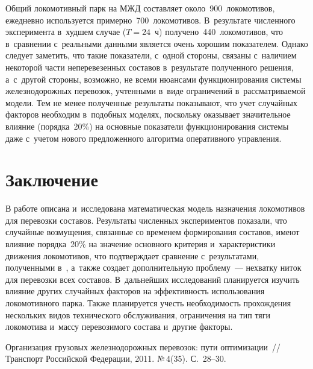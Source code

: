 \begin{multicols}{2}
Общий локомотивный парк на МЖД составляет около~900~локомотивов, 
ежедневно используется примерно~700~локомотивов.
В~результате численного эксперимента в~худшем случае ($T = 24$~ч) 
получено~440~локомотивов,
что в~сравнении с~реальными данными является очень хорошим показателем. Однако 
следует заметить,
что такие показатели, с~одной стороны, связаны с~наличием некоторой части 
неперевезенных составов в~результате полученного решения,
а~с~другой стороны, возможно, не всеми нюансами функционирования системы
 железнодорожных перевозок,
учтенными в~виде ограничений в~рассматриваемой модели. Тем не менее 
полученные результаты показывают, что учет случайных факторов необходим в~подобных 
моделях, поскольку оказывает значительное влияние (порядка~20\%) 
на основные показатели функционирования системы даже с~учетом нового 
предложенного алгоритма оперативного управления.

\vspace*{-6pt}

\section{Заключение}

\vspace*{-2pt}

В работе описана и~исследована математическая модель назначения локомотивов 
для перевозки составов.
Результаты численных экспериментов показали, что случайные возмущения, 
связанные со временем формирования составов,
имеют  влияние порядка~20\% на значение основного критерия и~характеристики
 движения локомотивов,
что подтверждает сравнение с~результатами, полученными в~\cite{AzanovBuyanov},
а~также создает дополнительную проблему~--- нехватку ниток для перевозки 
всех составов.
В~дальнейших исследований планируется изучить влияние других случайных факторов
на эффективность использования локомотивного парка.
Также планируется учесть необходимость прохождения нескольких видов 
технического обслуживания,
ограничения на тип тяги локомотива и~массу перевозимого состава и~другие факторы.

\renewcommand{\figurename}{\protect\bf Рис.}


{\small\frenchspacing
 {%
 \begin{thebibliography}{99}

Организация грузовых железнодорожных перевозок: пути оптимизации~// 
Транспорт Российской Федерации, 2011. №\,4(35). С.~28--30.


\end{thebibliography}}}
\end{multicols}
